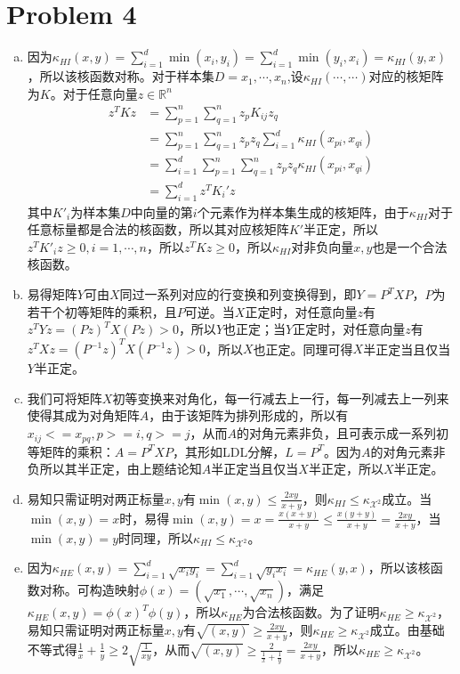 \documentclass[a4paper,UTF8]{article}
\numberwithin{equation}{section}
\begin{document}
\section*{Problem 4}
\begin{enumerate}[(a)]
    \item 因为$\kappa_{HI}(x,y)=\sum_{i=1}^d\min(x_i,y_i)=\sum_{i=1}^d\min(y_i,x_i)=\kappa_{HI}(y,x)$，所以该核函数对称。对于样本集$D=x_1,\cdots,x_n$,设$\kappa_{HI}(\cdots,\cdots)$对应的核矩阵为$K$。对于任意向量$z\in\mathbb{R}^n$
    \begin{align*}
        z^TKz &= \sum_{p=1}^n\sum_{q=1}^n z_pK_{ij}z_q\\
        &= \sum_{p=1}^n\sum_{q=1}^n z_pz_q\sum_{i=1}^d\kappa_{HI}(x_{pi},x_{qi})\\
        &= \sum_{i=1}^d\sum_{p=1}^n\sum_{q=1}^n z_pz_q\kappa_{HI}(x_{pi},x_{qi})\\
        &=\sum_{i=1}^dz^TK_{i}'z
    \end{align*}
    其中$K'_{i}$为样本集$D$中向量的第$i$个元素作为样本集生成的核矩阵，由于$\kappa_{HI}$对于任意标量都是合法的核函数，所以其对应核矩阵$K'$半正定，所以$z^TK'_{i}z\geq0,i=1,\cdots,n$，所以$z^TKz\geq 0$，所以$\kappa_{HI}$对非负向量$x,y$也是一个合法核函数。
    \item 易得矩阵$Y$可由$X$同过一系列对应的行变换和列变换得到，即$Y=P^TXP$，$P$为若干个初等矩阵的乘积，且$P$可逆。当$X$正定时，对任意向量$z$有$z^TYz=(Pz)^TX(Pz)>0$，所以$Y$也正定；当$Y$正定时，对任意向量$z$有$z^TXz=(P^{-1}z)^TX(P^{-1}z)>0$，所以$X$也正定。同理可得$X$半正定当且仅当$Y$半正定。
    \item 我们可将矩阵$X$初等变换来对角化，每一行减去上一行，每一列减去上一列来使得其成为对角矩阵$A$，由于该矩阵为排列形成的，所以有$x_{ij}<=x_{pq},p>=i,q>=j$，从而$A$的对角元素非负，且可表示成一系列初等矩阵的乘积：$A=P^TXP$，其形如LDL分解，$L=P^T$。因为$A$的对角元素非负所以其半正定，由上题结论知$A$半正定当且仅当$X$半正定，所以$X$半正定。
    \item 易知只需证明对两正标量$x,y$有$\min(x,y)\leq\frac{2xy}{x+y}$，则$\kappa_{HI}\leq\kappa_{\mathcal{X}^2}$成立。当$\min(x,y)=x$时，易得$\min(x,y)=x=\frac{x(x+y)}{x+y}\leq\frac{x(y+y)}{x+y}=\frac{2xy}{x+y}$，当$\min(x,y)=y$时同理，所以$\kappa_{HI}\leq\kappa_{\mathcal{X}^2}$。
    \item 因为$\kappa_{HE}(x,y)=\sum_{i=1}^d\sqrt{x_iy_i}=\sum_{i=1}^d\sqrt{y_ix_i}=\kappa_{HE}(y,x)$，所以该核函数对称。可构造映射$\phi(x)=(\sqrt{x_1},\cdots,\sqrt{x_n})$，满足$\kappa_{HE}(x,y)=\phi(x)^T\phi(y)$，所以$\kappa_{HE}$为合法核函数。为了证明$\kappa_{HE}\geq\kappa_{\mathcal{X}^2}$，易知只需证明对两正标量$x,y$有$\sqrt{(x,y)}\geq\frac{2xy}{x+y}$，则$\kappa_{HE}\geq\kappa_{\mathcal{X}^2}$成立。由基础不等式得$\frac{1}{x}+\frac{1}{y}\geq2\sqrt{\frac{1}{xy}}$，从而$\sqrt{(x,y)}\geq\frac{2}{\frac{1}{x}+\frac{1}{y}}=\frac{2xy}{x+y}$，所以$\kappa_{HE}\geq\kappa_{\mathcal{X}^2}$。

\end{enumerate}
\end{document}

